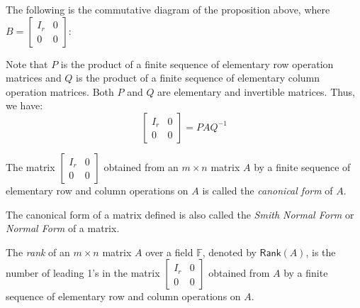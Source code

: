 \documentclass[
	11pt, %
	fleqn, %
	a4paper, %
]{LegrandOrangeBook}
\newcommand{\F}{\mathbb{F}} %
\newcommand{\rank}[1]{\mathsf{Rank}(#1)} %
\begin{document}
The following is the commutative diagram of the proposition above, where $B = \begin{bmatrix}
    I_r & 0 \\
    0 & 0
\end{bmatrix}$:

\begin{center}
\end{center}

Note that $P$ is the product of a finite sequence of elementary row operation matrices and $Q$ is the product of a finite sequence of elementary column operation matrices. Both $P$ and $Q$ are elementary and invertible matrices. Thus, we have:
\[
    \begin{bmatrix}
        I_r & 0 \\
        0 & 0
    \end{bmatrix} = P A Q^{-1}
\]

\begin{definition}
    The matrix $\begin{bmatrix}
        I_r & 0 \\
        0 & 0
    \end{bmatrix}$ obtained from an $m \times n$ matrix $A$ by a finite sequence of elementary row and column operations on $A$ is called the \emph{canonical form} of $A$.    
\end{definition}

\begin{remark}
    The canonical form of a matrix defined is also called the \emph{Smith Normal Form} or \emph{Normal Form} of a matrix.
\end{remark}

\begin{definition}
    The \emph{rank} of an $m \times n$ matrix $A$ over a field $\F$, denoted by $\rank{A}$, is the number of leading 1's in the matrix $\begin{bmatrix}
        I_r & 0 \\
        0 & 0
    \end{bmatrix}$ obtained from $A$ by a finite sequence of elementary row and column operations on $A$.
\end{definition}
\end{document}
